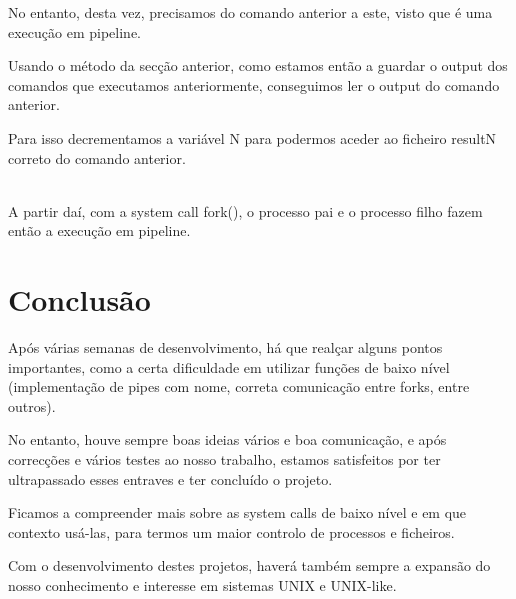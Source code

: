 \documentclass[11pt,a4paper]{report}
\begin{document}
No entanto, desta vez, precisamos do comando anterior a este, visto que é uma execução em pipeline.

Usando o método da secção anterior, como estamos então a guardar o output dos comandos que executamos anteriormente, conseguimos ler o output do comando anterior.

Para isso decrementamos a variável N para podermos aceder ao ficheiro resultN correto do comando anterior.
 
~\\

A partir daí, com a system call fork(), o processo pai e o processo filho fazem então a execução em pipeline.





\chapter{Conclusão}

Após várias semanas de desenvolvimento, há que realçar alguns pontos importantes, como a certa dificuldade em utilizar funções de baixo nível (implementação de pipes com nome, correta comunicação entre forks, entre outros). 

No entanto, houve sempre boas ideias vários e boa comunicação, e após correcções e vários testes ao nosso trabalho, estamos satisfeitos por ter ultrapassado esses entraves e ter concluído o projeto.

Ficamos a compreender mais sobre as system calls de baixo nível e em que contexto usá-las, para termos um maior controlo de processos e ficheiros. 

Com o desenvolvimento destes projetos, haverá também sempre a expansão do nosso conhecimento e interesse em sistemas UNIX e UNIX-like.
\end{document}
